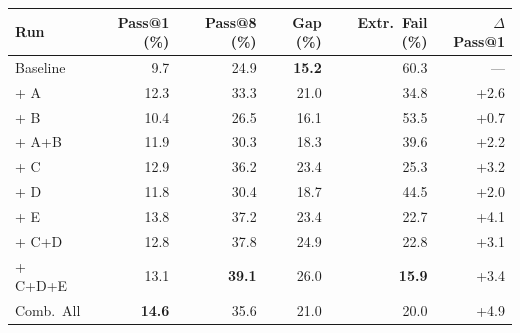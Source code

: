 \vspace{1em}
\noindent\begin{minipage}{\linewidth}
\centering
\addtocounter{table}{1}
\label{tab:p4-summary-full}
\begin{tabular*}{\linewidth}{@{\extracolsep{\fill}}lrrrrr}
\toprule
Run & Pass@1 (\%) & Pass@8 (\%) & Gap (\%) & Extr.\ Fail (\%) & $\Delta$ Pass@1 \\
\midrule
Baseline & 9.7 & 24.9 & \textbf{15.2} & 60.3 & --- \\
\midrule
+ A & 12.3 & 33.3 & 21.0 & 34.8 & +2.6 \\
+ B & 10.4 & 26.5 & 16.1 & 53.5 & +0.7 \\
+ A+B & 11.9 & 30.3 & 18.3 & 39.6 & +2.2 \\
\midrule
+ C & 12.9 & 36.2 & 23.4 & 25.3 & +3.2 \\
+ D & 11.8 & 30.4 & 18.7 & 44.5 & +2.0 \\
+ E & 13.8 & 37.2 & 23.4 & 22.7 & +4.1 \\
+ C+D & 12.8 & 37.8 & 24.9 & 22.8 & +3.1 \\
+ C+D+E & 13.1 & \textbf{39.1} & 26.0 & \textbf{15.9} & +3.4 \\
\midrule
Comb.\ All & \textbf{14.6} & 35.6 & 21.0 & 20.0 & +4.9 \\
\bottomrule
\end{tabular*}
\end{minipage}
\vspace{1em}
